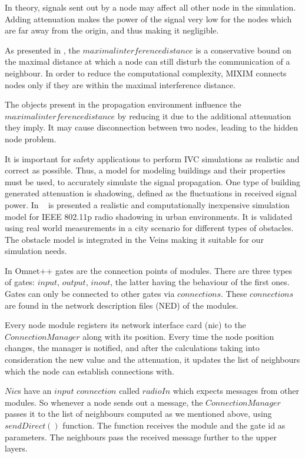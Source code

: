 In theory, signals sent out by a node may affect all other node in the
simulation. Adding attenuation makes the power of the signal very low for the
nodes which are far away from the origin, and thus making it negligible.

As presented in \cite{Kopke}, the $maximal interference distance$ is a
conservative bound on the maximal distance at which a node can still disturb the
communication of a neighbour. In order to reduce the computational complexity,
MIXIM connects nodes only if they are within the maximal interference distance.

The objects present in the propagation environment influence the $maximal
interference distance$ by reducing it due to the additional attenuation they
imply. It may cause disconnection between two nodes, leading to the hidden node
problem.

It is important for safety applications to perform IVC simulations as realistic
and correct as possible. Thus, a model for modeling buildings and their
properties must be used, to accurately simulate the signal propagation. One
type of building generated attenuation is shadowing, defined as the fluctuations
in received signal power. In ~\cite{sommer2011computationally} is presented a
realistic and computationally inexpensive simulation model for IEEE 802.11p
radio shadowing in urban environments. It is validated using real world
measurements in a city scenario for different types of obstacles. The obstacle
model is integrated in the Veins making it suitable for our simulation needs.

In Omnet++ gates are the connection points of modules. There are three types of
gates: $input$, $output$, $inout$, the latter having the behaviour of the first
ones. Gates can only be connected to other gates via $connections$. These
$connections$ are found in the network description files (NED) of the modules.

Every node module registers its network interface card (nic) to the
$ConnectionManager$ along with its position. Every time the node position
changes, the manager is notified, and after the calculations taking into
consideration the new value and the attenuation, it updates the list of
neighbours which the node can establish connections with.

$Nic$s have an $input$ $connection$ called $radioIn$ which expects messages from
other modules. So whenever a node sends out a message, the $ConnectionManager$
passes it to the list of neighbours computed as we mentioned above, using
$sendDirect()$ function. The function receives the module and the gate id as
parameters. The neighbours pass the received message further to the upper
layers.

